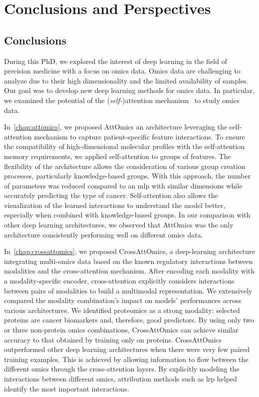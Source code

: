 \documentclass[../main.tex]{subfiles}
\begin{document}
\chapter{Conclusions and Perspectives}
\minitocpage
\section{Conclusions}
	During this PhD, we explored the interest of deep learning in the field of precision medicine with a focus on omics data.
	Omics data are challenging to analyze due to their high dimensionality and the limited availability of samples.
	Our goal was to develop new deep learning methods for omics data.
	In particular, we examined the potential of the (\emph{self-})attention mechanism~\cite{AttentionAllYouNeed} to study omics data.

	In~\cref{chap:attomics}, we proposed AttOmics an architecture leveraging the self-attention mechanism to capture patient-specific feature interactions.
	To ensure the compatibility of high-dimensional molecular profiles with the self-attention memory requirements, we applied self-attention to groups of features.
	The flexibility of the architecture allows the consideration of various group creation processes, particularly knowledge-based groups.
	With this approach, the number of parameters was reduced compared to an \gls{mlp} with similar dimensions while accurately predicting the type of cancer.
	Self-attention also allows the visualization of the learned interactions to understand the model better, especially when combined with knowledge-based groups.
	In our comparison with other deep learning architectures, we observed that AttOmics was the only architecture consistently performing well on different omics data.

	In~\cref{chap:crossattomics}, we proposed CrossAttOmics, a deep-learning architecture integrating multi-omics data based on the known regulatory interactions between modalities and the cross-attention mechanism.
	After encoding each modality with a modality-specific encoder, cross-attention explicitly considers interactions between pairs of modalities to build a multimodal representation.
	We extensively compared the modality combination's impact on models' performances across various architectures.
	We identified proteomics as a strong modality: selected proteins are cancer biomarkers and, therefore, good predictors.
	By using only two or three non-protein omics combinations, CrossAttOmics can achieve similar accuracy to that obtained by training only on proteins.
	CrossAttOmics outperformed other deep learning architectures when there were very few paired training examples.
	This is achieved by allowing information to flow between the different omics through the cross-attention layers.
	By explicitly modeling the interactions between different omics, attribution methods such as \gls{lrp} helped identify the most important interactions.
\end{document}
